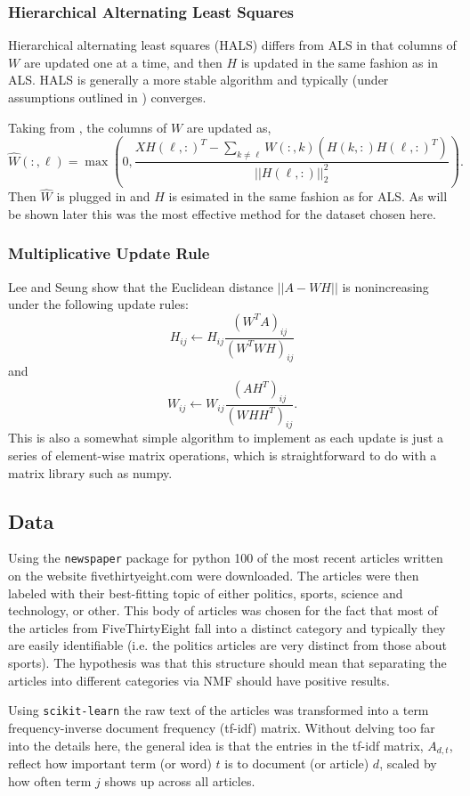 \documentclass[12pt]{article}
\begin{document}
\subsubsection*{Hierarchical Alternating Least Squares}
Hierarchical alternating least squares (HALS) differs from ALS in that columns of $W$ are updated one at a time, and then $H$ is updated in the same fashion as in ALS. HALS is generally a more stable algorithm and typically (under assumptions outlined in \cite{gillis2012}) converges.

Taking from \cite{gillis2012}, the columns of $W$ are updated as,
\[
    \hat{W}(:, \ell) = \max\left(0,
    \frac{XH(\ell, :)^{T} - \sum_{k\neq\ell}W(:, k)\left( H(k, :)H(\ell, :)^T \right)}
    {||H(\ell, :)||_{2}^{2}} \right).
\]
Then $\hat{W}$ is plugged in and $H$ is esimated in the same fashion as for ALS. As will be shown later this was the most effective method for the dataset chosen here.


\subsubsection*{Multiplicative Update Rule}
Lee and Seung \cite{lee2001} show that the Euclidean distance $||A - WH||$ is nonincreasing under the following update rules:
\[
    H_{ij} \leftarrow H_{ij}\frac{(W^TA)_{ij}}{(W^TWH)_{ij}}
\]
and
\[
    W_{ij} \leftarrow W_{ij}\frac{(AH^T)_{ij}}{(WHH^T)_{ij}}.
\]
This is also a somewhat simple algorithm to implement as each update is just a series of element-wise matrix operations, which is straightforward to do with a matrix library such as numpy.

\subsection*{Data}

Using the \verb|newspaper| package for python 100 of the most recent articles written on the website fivethirtyeight.com were downloaded. The articles were then labeled with their best-fitting topic of either politics, sports, science and technology, or other. This body of articles was chosen for the fact that most of the articles from FiveThirtyEight fall into a distinct category and typically they are easily identifiable (i.e. the politics articles are very distinct from those about sports). The hypothesis was that this structure should mean that separating the articles into different categories via NMF should have positive results.

Using \verb|scikit-learn| the raw text of the articles was transformed into a term frequency-inverse document frequency (tf-idf) matrix. Without delving too far into the details here, the general idea is that the entries in the tf-idf matrix, $A_{d,t}$, reflect how important term (or word) $t$ is to document (or article) $d$, scaled by how often term $j$ shows up across all articles.
\end{document}
